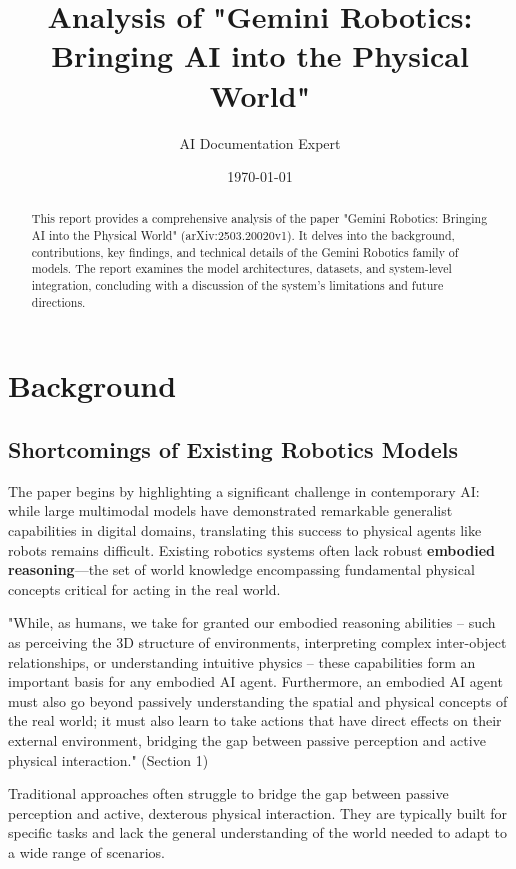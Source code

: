 \documentclass{article}
\title{Analysis of "Gemini Robotics: Bringing AI into the Physical World"}
\author{AI Documentation Expert}
\date{\today}
\begin{document}
\maketitle

\begin{abstract}
This report provides a comprehensive analysis of the paper "Gemini Robotics: Bringing AI into the Physical World" (arXiv:2503.20020v1). It delves into the background, contributions, key findings, and technical details of the Gemini Robotics family of models. The report examines the model architectures, datasets, and system-level integration, concluding with a discussion of the system's limitations and future directions.
\end{abstract}

\tableofcontents
\newpage

\section{Background}

\subsection{Shortcomings of Existing Robotics Models}
The paper begins by highlighting a significant challenge in contemporary AI: while large multimodal models have demonstrated remarkable generalist capabilities in digital domains, translating this success to physical agents like robots remains difficult. Existing robotics systems often lack robust \textbf{embodied reasoning}—the set of world knowledge encompassing fundamental physical concepts critical for acting in the real world.

\begin{mdframed}[backgroundcolor=gray!10]
"While, as humans, we take for granted our embodied reasoning abilities – such as perceiving the 3D structure of environments, interpreting complex inter-object relationships, or understanding intuitive physics – these capabilities form an important basis for any embodied AI agent. Furthermore, an embodied AI agent must also go beyond passively understanding the spatial and physical concepts of the real world; it must also learn to take actions that have direct effects on their external environment, bridging the gap between passive perception and active physical interaction." (Section 1)
\end{mdframed}

Traditional approaches often struggle to bridge the gap between passive perception and active, dexterous physical interaction. They are typically built for specific tasks and lack the general understanding of the world needed to adapt to a wide range of scenarios.
\end{document}
